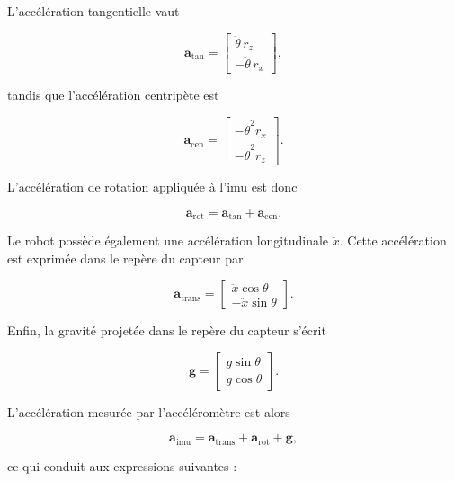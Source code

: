 L'accélération tangentielle vaut

\begin{equation}
\mathbf{a}_{\mathrm{tan}}
=
\begin{bmatrix}
\ddot{\theta}\,r_z\\
-\ddot{\theta}\,r_x
\end{bmatrix},
\end{equation}

tandis que l'accélération centripète est

\begin{equation}
\mathbf{a}_{\mathrm{cen}}
=
\begin{bmatrix}
-\dot{\theta}^{2}r_x\\
-\dot{\theta}^{2}r_z
\end{bmatrix}.
\end{equation}

L'accélération de rotation appliquée à l'\acrshort{imu} est donc

\begin{equation}
\mathbf{a}_{\mathrm{rot}}
=
\mathbf{a}_{\mathrm{tan}}
+
\mathbf{a}_{\mathrm{cen}}.
\end{equation}

Le robot possède également une accélération longitudinale $\ddot{x}$. Cette accélération est exprimée dans le repère du capteur par

\begin{equation}
\mathbf{a}_{\mathrm{trans}}
=
\begin{bmatrix}
\ddot{x}\cos\theta\\
-\ddot{x}\sin\theta
\end{bmatrix}.
\end{equation}

Enfin, la gravité projetée dans le repère du capteur s'écrit

\begin{equation}
\mathbf{g}
=
\begin{bmatrix}
g\sin\theta\\
g\cos\theta
\end{bmatrix}.
\end{equation}

L'accélération mesurée par l'accéléromètre est alors

\begin{equation}
\mathbf{a}_{\mathrm{imu}}
=
\mathbf{a}_{\mathrm{trans}}
+
\mathbf{a}_{\mathrm{rot}}
+
\mathbf{g},
\end{equation}

ce qui conduit aux expressions suivantes :

